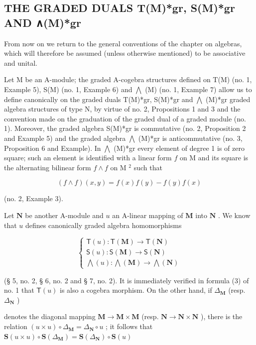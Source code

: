\subsection{THE GRADED DUALS T(M)*gr, S(M)*gr AND ∧(M)*gr}

From now on we return to the general conventions of the chapter on algebras, which will therefore be assumed (unless otherwise mentioned) to be associative and unital.

Let M be an A-module; the graded A-cogebra structures defined on T(M) (no. 1, Example 5), S(M) (no. 1, Example 6) and \(\bigwedge\) (M) (no. 1, Example 7) allow us to define canonically on the graded duals T(M)*gr, S(M)*gr and \(\bigwedge\) (M)*gr graded algebra structures of type N, by virtue of no. 2, Propositions 1 and 3 and the convention made on the graduation of the graded dual of a graded module (no. 1). Moreover, the graded algebra S(M)*gr is commutative (no. 2, Proposition 2 and Example 5) and the graded algebra \(\bigwedge\) (M)*gr is anticommutative (no. 3, Proposition 6 and Example). In \(\bigwedge\) (M)*gr every element of degree 1 is of zero square; such an element is identified with a linear form \(f\) on M and its square is the alternating bilinear form \(f \wedge f\) on M \(^{2}\) such that

\[
(f \wedge f) (x, y) = f (x) f (y) - f (y) f (x)
\]

(no. 2, Example 3).

Let \(\mathbf{N}\) be another A-module and \(u\) an A-linear mapping of \(\mathbf{M}\) into \(\mathbf{N}\) . We know that \(u\) defines canonically graded algebra homomorphisms

\[
\left\{ \begin{array}{l} \mathsf {T} (u): \mathsf {T} (\mathbf {M}) \to \mathsf {T} (\mathbf {N}) \\ \mathsf {S} (u): \mathsf {S} (\mathbf {M}) \to \mathsf {S} (\mathbf {N}) \\ \bigwedge (u): \bigwedge (\mathbf {M}) \to \bigwedge (\mathbf {N}) \end{array} \right.\tag{23}
\]

(§ 5, no. 2, § 6, no. 2 and § 7, no. 2). It is immediately verified in formula (3) of no. 1 that \(\mathsf{T}(u)\) is also a cogebra morphism. On the other hand, if \(\Delta_{\mathbf{M}}\) (resp. \(\Delta_{\mathbf{N}}\) )

denotes the diagonal mapping \(\mathbf{M} \to \mathbf{M} \times \mathbf{M}\) (resp. \(\mathbf{N} \to \mathbf{N} \times \mathbf{N}\) ), there is the relation \((u \times u) \circ \Delta_{\mathbf{M}} = \Delta_{\mathbf{N}} \circ u\) ; it follows that \(\mathbf{S}(u \times u) \circ \mathbf{S}(\Delta_{\mathbf{M}}) = \mathbf{S}(\Delta_{\mathbf{N}}) \circ \mathbf{S}(u)\)


